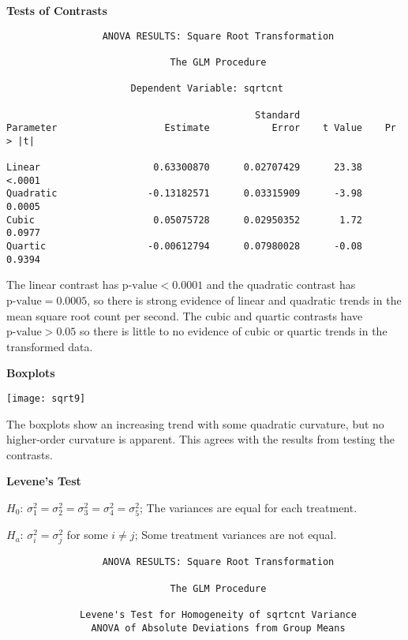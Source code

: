 \documentclass[11pt]{article}
\begin{document}
\begin{enumerate}
\begin{enumerate}
\pagebreak
\textbf{Tests of Contrasts}

\begin{verbatim}
                 ANOVA RESULTS: Square Root Transformation

                             The GLM Procedure
 
                      Dependent Variable: sqrtcnt   

                                            Standard
Parameter                   Estimate           Error    t Value    Pr > |t|

Linear                    0.63300870      0.02707429      23.38      <.0001
Quadratic                -0.13182571      0.03315909      -3.98      0.0005
Cubic                     0.05075728      0.02950352       1.72      0.0977
Quartic                  -0.00612794      0.07980028      -0.08      0.9394
\end{verbatim}

The linear contrast has \(\text{p-value}<0.0001\) and the quadratic contrast
has \(\text{p-value}=0.0005\), so there is strong evidence of linear and
quadratic trends in the mean square root count per second. The cubic and
quartic contrasts have \(\text{p-value}>0.05\) so there is little to no
evidence of cubic or quartic trends in the transformed data.

\textbf{Boxplots}

\begin{center}\texttt{[image: sqrt9]}\end{center}

The boxplots show an increasing trend with some quadratic curvature, but no
higher-order curvature is apparent. This agrees with the results from testing
the contrasts.

\pagebreak
\textbf{Levene's Test}

\(H_0\): \(\sigma^2_1=\sigma^2_2=\sigma^2_3=\sigma^2_4=\sigma^2_5\); The
variances are equal for each treatment.

\(H_a\): \(\sigma^2_i=\sigma^2_j\) for some \(i\neq j\); Some treatment
variances are not equal.

\begin{verbatim}
                 ANOVA RESULTS: Square Root Transformation

                             The GLM Procedure

             Levene's Test for Homogeneity of sqrtcnt Variance
               ANOVA of Absolute Deviations from Group Means
 

\end{verbatim}
\end{enumerate}
\end{enumerate}
\end{document}
